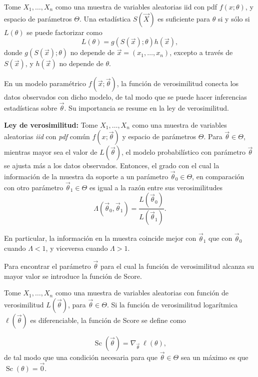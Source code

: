 		\begin{theo}
			Tome $X_1,\dots,X_n$ como una muestra de variables aleatorias iid con pdf $f(x;\theta)$, y espacio de parámetros $\Theta$. Una estadística $S(\vec{X})$ es suficiente para $\theta$ si y sólo si $L(\theta)$ se puede factorizar como
			$$L(\theta)=g(S(\vec{x});\theta)h(\vec{x}),$$
			donde $g(S(\vec{x});\theta)$ no depende de $\vec{x}=(x_1,\dots,x_n)$, excepto a través de $S(\vec{x})$, y $h(\vec{x})$ no depende de $\theta$.
		\end{theo}
		En un modelo paramétrico $f(\vec{x};\vec{\theta})$, la función de verosimilitud conecta los datos observados con dicho modelo, de tal modo que se puede hacer inferencias estadísticas sobre $\vec{\theta}$. Su importancia se resume en la ley de verosimilitud.
		
		\textbf{Ley de verosimilitud:} Tome $X_1,\dots,X_n$ como una muestra de variables aleatorias \textit{iid} con \textit{pdf} común $f(x;\vec{\theta})$ y espacio de parámetros $\Theta$. Para $\vec{\theta}\in\Theta$, mientras mayor sea el valor de $L(\vec{\theta})$, el modelo probabilístico con parámetro $\vec{\theta}$ se ajusta más a los datos observados. Entonces, el grado con el cual la información de la muestra da soporte a un parámetro $\vec{\theta}_0\in\Theta$, en comparación con otro parámetro $\vec{\theta}_1\in\Theta$ es igual a la razón entre sus verosimilitudes
		$$\Lambda(\vec{\theta}_0,\vec{\theta}_1)=\frac{L(\vec{\theta}_0)}{L(\vec{\theta}_1)}.$$
		
		En particular, la información en la muestra coincide mejor con $\vec{\theta}_1$ que con $\vec{\theta}_0$ cuando $\Lambda<1$, y viceversa cuando $\Lambda>1.$
		
		Para encontrar el parámetro $\vec{\theta}$ para el cual la función de verosimilitud alcanza su mayor valor se introduce la función de Score.
		
		\begin{defi}
			Tome $X_1,\dots,X_n$ como una muestra de variables aleatorias con función de verosimilitud $L(\vec{\theta})$, para $\vec{\theta}\in\Theta$. Si la función de verosimilitud logarítmica $\ell(\vec{\theta})$ es diferenciable, la función de Score se define como
			
			$$\mathop{Sc}(\vec{\theta})=\nabla_{\vec{\theta}}\ \ell(\theta),$$
			de tal modo que una condición necesaria para que $\vec{\theta}\in\Theta$ sea un máximo es que $\mathop{Sc}(\theta)=\vec{0}.$
		\end{defi}
		
